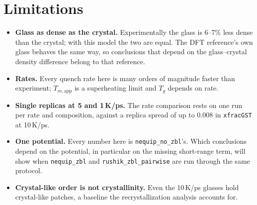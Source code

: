 \documentclass[11pt]{article}
\newcommand{\nozbl}{\texttt{nequip\_no\_zbl}}
\begin{document}
\section{Limitations}
\begin{itemize}
\item \textbf{Glass as dense as the crystal.} Experimentally the glass is 6--7\% less dense than the crystal; with
this model the two are equal. The DFT reference's own glass behaves the same
way, so conclusions that depend on the glass--crystal density difference belong to that reference.
\item \textbf{Rates.} Every quench rate here is many orders of magnitude faster than experiment; $T_{m,\text{app}}$
is a superheating limit and $T_g$ depends on rate.
\item \textbf{Single replicas at 5 and 1\,K/ps.} The rate comparison rests on one run per rate and composition,
against a replica spread of up to 0.008 in \texttt{xfracGST} at 10\,K/ps.
\item \textbf{One potential.} Every number here is \nozbl{}'s. Which conclusions depend on the potential, in
particular on the missing short-range term, will show when \texttt{nequip\_zbl} and \texttt{rushik\_zbl\_pairwise}
are run through the same protocol.
\item \textbf{Crystal-like order is not crystallinity.} Even the 10\,K/ps glasses hold crystal-like patches, a
baseline the recrystallization analysis accounts for.
\end{itemize}
\end{document}
